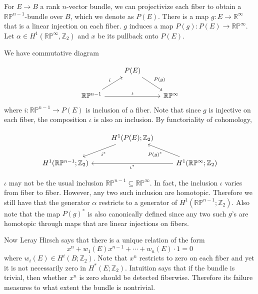 \documentclass[12pt]{article}
\theoremstyle{plain}
\theoremstyle{definition}
\newcommand{\IP}{\mathbb{P}}
\newcommand{\IR}{\mathbb{R}}
\newcommand{\IZ}{\mathbb{Z}}
\newcommand{\<}{\langle}
\renewcommand{\>}{\rangle}
\begin{document}
For $E \to B$ a rank $n$-vector bundle, we can projectivize each fiber to obtain a $\IR \IP^{n - 1}$-bundle over $B$, which we denote as $P(E)$. There is a map $g : E \to \IR^\infty$ that is a linear injection on each fiber. $g$ induces a map $P(g) : P(E) \to \IR \IP^\infty$. Let $\alpha \in H^1(\IR \IP^\infty, \IZ_2)$ and $x$ be its pullback onto $P(E)$. 

We have commutative diagram

\[
\begin{tikzcd}
{} & P(E) \arrow{dr}{P(g)} \\
\IR \IP^{n - 1} \arrow{ur}{i} \arrow{rr}{\iota} && \IR \IP^\infty
\end{tikzcd}
\]
where $i : \IR \IP^{n - 1} \to P(E)$ is inclusion of a fiber. Note that since $g$ is injective on each fiber, the composition $\iota$ is also an inclusion.
By functoriality of cohomology, 

\[
\begin{tikzcd}
{} & H^1(P(E); \IZ_2)  \arrow{dl}{i^*}\\
H^1(\IR \IP^{n - 1}; \IZ_2)   && H^1(\IR \IP^\infty; \IZ_2) \arrow{ll}{\iota^*} \arrow{ul}{P(g)^*}
\end{tikzcd}
\]

$\iota$ may not be the usual inclusion $\IR \IP^{ n - 1} \subseteq \IR \IP^\infty$. In fact, the inclusion $\iota$ varies from fiber to fiber. However, any two such inclusion are homotopic. Therefore we still have that the generator $\alpha$ restricts to a generator of $H^1(\IR \IP^{n - 1}; \IZ_2)$. Also note that the map $P(g)^*$ is also canonically defined since any two such $g$'s are homotopic through maps that are linear injections on fibers. 

Now Leray Hirsch says that there is a unique relation of the form 
$$ x^n + w_1(E) x^{n - 1} + \cdots + w_n(E) \cdot 1 = 0$$ where $w_i(E) \in H^i(B; \IZ_2)$. 
Note that $x^n$ restricts to zero on each fiber and yet it is not necessarily zero in $H^*(E; \IZ_2)$. Intuition says that if the bundle is trivial, then whether $x^n$ is zero should be detected fiberwise. Therefore its failure measures to what extent the bundle is nontrivial. 
\end{document}
